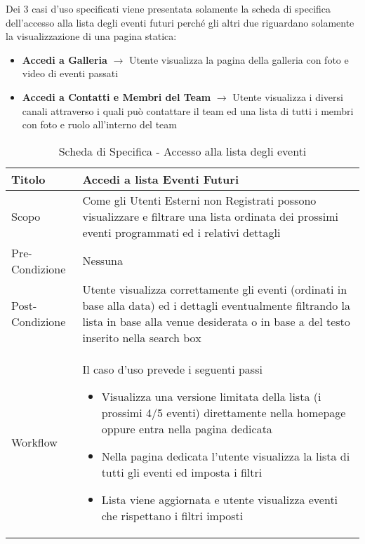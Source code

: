 Dei 3 casi d'uso specificati viene presentata solamente la scheda di specifica dell'accesso alla lista 
degli eventi futuri perché gli altri due riguardano solamente la visualizzazione di una pagina statica:
\begin{itemize}
    \item \textbf{Accedi a Galleria} $\rightarrow$ Utente visualizza la pagina della galleria con foto e video di eventi passati
    \item \textbf{Accedi a Contatti e Membri del Team} $\rightarrow$ Utente visualizza i diversi canali attraverso i quali può contattare il team ed una lista di tutti i membri con foto e ruolo all'interno del team
\end{itemize}

\begin{table}[H]
    \begin{center}  
        \begin{tabular}{ | l | p{13cm} |} %
        \hline
        \textbf{Titolo} & \textbf{Accedi a lista Eventi Futuri}\\ \hline  
           
        Scopo & Come gli Utenti Esterni non Registrati possono visualizzare e filtrare una lista ordinata dei prossimi eventi programmati ed i relativi dettagli\\ \hline  
           
        Pre-Condizione & Nessuna\\ \hline  
           
        Post-Condizione & Utente visualizza correttamente gli eventi (ordinati in base alla data) ed i dettagli eventualmente filtrando la lista in base alla venue desiderata o in base a del testo inserito nella search box\\ \hline  
           
        Workflow & Il caso d'uso prevede i seguenti passi
        \begin{itemize}
            \item Visualizza una versione limitata della lista (i prossimi 4/5 eventi) direttamente nella homepage oppure entra nella pagina dedicata
            \item Nella pagina dedicata l'utente visualizza la lista di tutti gli eventi ed imposta i filtri
            \item Lista viene aggiornata e utente visualizza eventi che rispettano i filtri imposti
        \end{itemize}\\  
        \hline
           
        \end{tabular}  
        \caption{Scheda di Specifica - Accesso alla lista degli eventi}
    \end{center}  
\end{table}